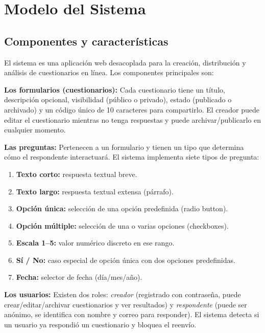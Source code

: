 \documentclass[12pt,a4paper]{article}
\begin{document}
\tableofcontents
\newpage

\section{Modelo del Sistema}

\subsection{Componentes y características}

El sistema es una aplicación web desacoplada para la creación, distribución y análisis de cuestionarios en línea. Los componentes principales son:

\textbf{Los formularios (cuestionarios):}
Cada cuestionario tiene un título, descripción opcional, visibilidad (público o privado), estado (publicado o archivado) y un código único de 10 caracteres para compartirlo. El creador puede editar el cuestionario mientras no tenga respuestas y puede archivar/publicarlo en cualquier momento.

\textbf{Las preguntas:}
Pertenecen a un formulario y tienen un tipo que determina cómo el respondente interactuará. El sistema implementa siete tipos de pregunta:

\begin{enumerate}
  \item \textbf{Texto corto:} respuesta textual breve.
  \item \textbf{Texto largo:} respuesta textual extensa (párrafo).
  \item \textbf{Opción única:} selección de una opción predefinida (radio button).
  \item \textbf{Opción múltiple:} selección de una o varias opciones (checkboxes).
  \item \textbf{Escala 1--5:} valor numérico discreto en ese rango.
  \item \textbf{Sí / No:} caso especial de opción única con dos opciones predefinidas.
  \item \textbf{Fecha:} selector de fecha (día/mes/año).
\end{enumerate}

\textbf{Los usuarios:}
Existen dos roles: \textit{creador} (registrado con contraseña, puede crear/editar/archivar cuestionarios y ver resultados) y \textit{respondente} (puede ser anónimo, se identifica con nombre y correo para responder). El sistema detecta si un usuario ya respondió un cuestionario y bloquea el reenvío.
\end{document}

